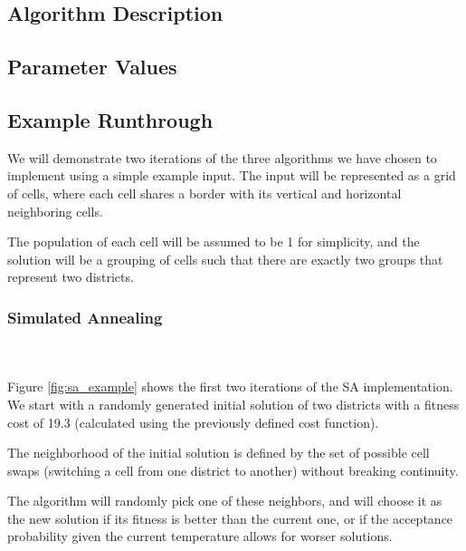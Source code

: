 \documentclass[journal]{IEEEtran}
\begin{document}
\subsection{Algorithm Description}
\subsection{Parameter Values}
\subsection{Example Runthrough}
We will demonstrate two iterations of the three algorithms we have chosen to implement using a simple example input.
The input will be represented as a grid of cells, where each cell shares a border with its vertical and horizontal neighboring cells. 

The population of each cell will be assumed to be 1 for simplicity, and the solution will be a grouping of cells such that there are exactly two groups that represent two districts. \\

\subsubsection{Simulated Annealing}~\\\\
Figure \ref{fig:sa_example} shows the first two iterations of the SA implementation.
We start with a randomly generated initial solution of two districts with a fitness cost of 19.3 (calculated using the previously defined cost function).

The neighborhood of the initial solution is defined by the set of possible cell swaps (switching a cell from one district to another) without breaking continuity.

The algorithm will randomly pick one of these neighbors, and will choose it as the new solution if its fitness is better than the current one, or if the acceptance probability given the current temperature allows for worser solutions.
\end{document}
